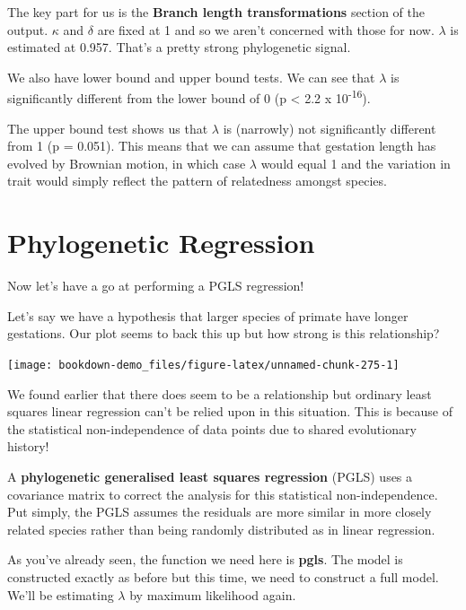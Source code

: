 \documentclass[
]{book}
\begin{document}
The key part for us is the \textbf{Branch length transformations} section of the output. \(\kappa\) and \(\delta\) are fixed at 1 and so we aren't concerned with those for now. \(\lambda\) is estimated at 0.957. That's a pretty strong phylogenetic signal.

We also have lower bound and upper bound tests. We can see that \(\lambda\) is significantly different from the lower bound of 0 (p \textless{} 2.2 x 10\textsuperscript{-16}).

The upper bound test shows us that \(\lambda\) is (narrowly) not significantly different from 1 (p = 0.051). This means that we can assume that gestation length has evolved by Brownian motion, in which case \(\lambda\) would equal 1 and the variation in trait would simply reflect the pattern of relatedness amongst species.

\hypertarget{phylogenetic-regression}{%
\section{Phylogenetic Regression}\label{phylogenetic-regression}}

Now let's have a go at performing a PGLS regression!

Let's say we have a hypothesis that larger species of primate have longer gestations. Our plot seems to back this up but how strong is this relationship?

\begin{center}\texttt{[image: bookdown-demo\_files/figure-latex/unnamed-chunk-275-1]} \end{center}

We found earlier that there does seem to be a relationship but ordinary least squares linear regression can't be relied upon in this situation. This is because of the statistical non-independence of data points due to shared evolutionary history!

A \textbf{phylogenetic generalised least squares regression} (PGLS) uses a covariance matrix to correct the analysis for this statistical non-independence. Put simply, the PGLS assumes the residuals are more similar in more closely related species rather than being randomly distributed as in linear regression.

As you've already seen, the function we need here is \textbf{pgls}. The model is constructed exactly as before but this time, we need to construct a full model. We'll be estimating \(\lambda\) by maximum likelihood again.
\end{document}

